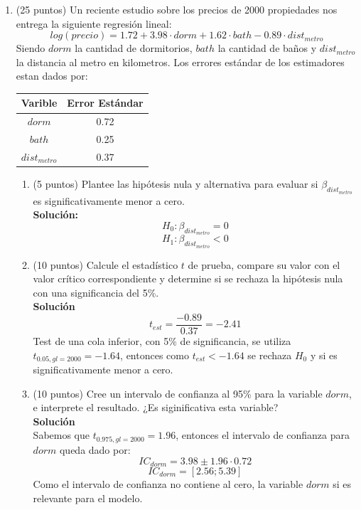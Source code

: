 \documentclass[10pt,a4paper]{article}
\begin{document}
\begin{enumerate}
    \item (25 puntos) Un reciente estudio sobre los precios de 2000 propiedades nos entrega la siguiente regresión lineal:
    $$log(precio) = 1.72 + 3.98\cdot dorm + 1.62\cdot bath - 0.89 \cdot dist_{metro}$$ 
    Siendo $dorm$ la cantidad de dormitorios, $bath$ la cantidad de baños y $dist_{metro}$ la distancia al metro en kilometros. Los errores estándar de los estimadores estan dados por:
    \begin{center}
        \begin{table}[H]
            \centering
            \begin{tabular}{|c|c|}
            \hline
                Varible & Error Estándar \\
                \hline
                $dorm$ & 0.72 \\
                \hline
                $bath$ & 0.25 \\
                \hline
                $dist_{metro}$ & 0.37 \\
                \hline
            \end{tabular}
        \end{table}
    \end{center}
        \begin{enumerate}
          \item (5 puntos) Plantee las hipótesis nula y alternativa para evaluar si
                \( \beta_{dist_{metro}} \) es significativamente menor a cero. \\
                \textbf{Solución:}
                \\
                $$H_0 : \beta_{dist_{metro}} = 0 $$
                $$H_1 : \beta_{dist_{metro}} < 0 $$
          \item (10 puntos) Calcule el estadístico \( t \) de prueba, compare su valor
                con el valor crítico correspondiente y determine si se
                rechaza la hipótesis nula con una significancia del 5\%. \\
                \textbf{Solución}
                \\
                $$t_{est}=\frac{-0.89}{0.37}=-2.41$$
                Test de una cola inferior, con 5\% de significancia, se utiliza $t_{0.05,gl=2000}=-1.64$, entonces como $t_{est}<-1.64$ se rechaza $H_0$ y si es significativamente menor a cero.
                
            \item (10 puntos) Cree un intervalo de confianza al 95\% para la variable $dorm$, e interprete el resultado. ¿Es siginificativa esta variable? \\
            \textbf{Solución}
            \\
            Sabemos que $t_{0.975,gl=2000}=1.96$, entonces el intervalo de confianza para $dorm$ queda dado por:
            $$IC_{dorm} = 3.98 \pm 1.96\cdot 0.72$$
            $$IC_{dorm} = [2.56;5.39]$$
        Como el intervalo de confianza no contiene al cero, la variable $dorm$ si es relevante para el modelo.
        \end{enumerate}



\end{enumerate}
\end{document}
